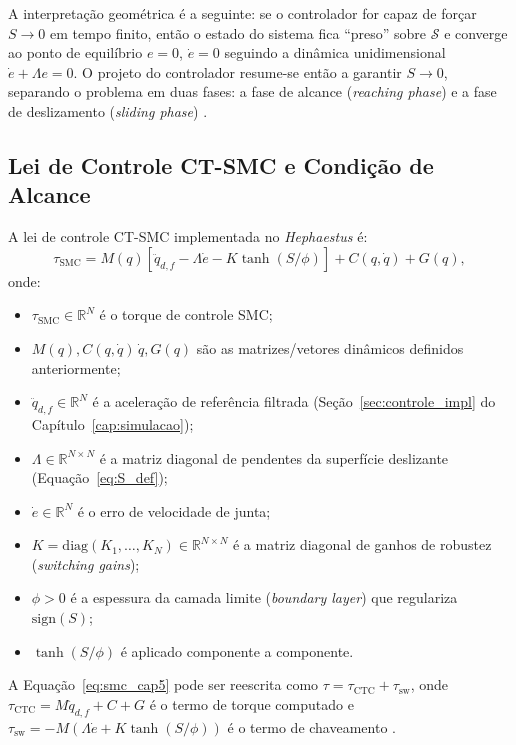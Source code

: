A interpretação geométrica é a seguinte: se o controlador for capaz de forçar $S \to 0$ em tempo finito, então o estado do sistema fica ``preso'' sobre $\mathcal{S}$ e converge ao ponto de equilíbrio $e = 0$, $\dot{e} = 0$ seguindo a dinâmica unidimensional $\dot{e} + \Lambda e = 0$. O projeto do controlador resume-se então a garantir $S \to 0$, separando o problema em duas fases: a fase de alcance (\textit{reaching phase}) e a fase de deslizamento (\textit{sliding phase}) \cite{edwards1998sliding, utkin2017sliding}.

\subsection{Lei de Controle CT-SMC e Condição de Alcance}

A lei de controle CT-SMC implementada no \textit{Hephaestus} é:
\begin{equation}
    \tau_{\text{SMC}} = M(q)\left[\ddot{q}_{d,f} - \Lambda\dot{e} - K\tanh(S/\phi)\right] + C(q,\dot{q}) + G(q),
    \label{eq:smc_cap5}
\end{equation}
onde:
\begin{itemize}
    \item $\tau_{\text{SMC}} \in \mathbb{R}^N$ é o torque de controle SMC;
    \item $M(q), C(q,\dot{q})\,\dot{q}, G(q)$ são as matrizes/vetores dinâmicos definidos anteriormente;
    \item $\ddot{q}_{d,f} \in \mathbb{R}^N$ é a aceleração de referência filtrada (Seção~\ref{sec:controle_impl} do Capítulo~\ref{cap:simulacao});
    \item $\Lambda \in \mathbb{R}^{N \times N}$ é a matriz diagonal de pendentes da superfície deslizante (Equação~\eqref{eq:S_def});
    \item $\dot{e} \in \mathbb{R}^N$ é o erro de velocidade de junta;
    \item $K = \text{diag}(K_1, \ldots, K_N) \in \mathbb{R}^{N \times N}$ é a matriz diagonal de ganhos de robustez (\textit{switching gains});
    \item $\phi > 0$ é a espessura da camada limite (\textit{boundary layer}) que regulariza $\text{sign}(S)$;
    \item $\tanh(S/\phi)$ é aplicado componente a componente.
\end{itemize} A Equação~\eqref{eq:smc_cap5} pode ser reescrita como $\tau = \tau_{\text{CTC}} + \tau_{\text{sw}}$, onde $\tau_{\text{CTC}} = M\ddot{q}_{d,f} + C + G$ é o termo de torque computado e $\tau_{\text{sw}} = -M(\Lambda\dot{e} + K\tanh(S/\phi))$ é o termo de chaveamento \cite{slotine1991applied}.

